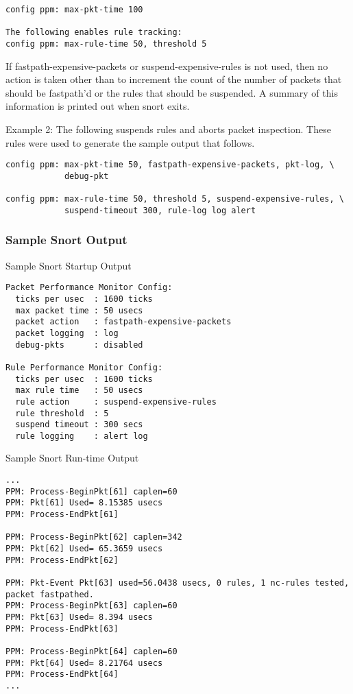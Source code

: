 \documentclass[english]{report}
\begin{document}
\begin{verbatim}
config ppm: max-pkt-time 100

The following enables rule tracking:
config ppm: max-rule-time 50, threshold 5
\end{verbatim}

If fastpath-expensive-packets or suspend-expensive-rules is not used, then
no action is taken other than to increment the count of the number of
packets that should be fastpath'd or the rules that should be suspended. A
summary of this information is printed out when snort exits.

Example 2:
The following suspends rules and aborts packet inspection.  These rules
were used to generate the sample output that follows.

\begin{verbatim}
config ppm: max-pkt-time 50, fastpath-expensive-packets, pkt-log, \
            debug-pkt

config ppm: max-rule-time 50, threshold 5, suspend-expensive-rules, \
            suspend-timeout 300, rule-log log alert
\end{verbatim}


\subsubsection{Sample Snort Output}

Sample Snort Startup Output
\begin{verbatim}
Packet Performance Monitor Config:
  ticks per usec  : 1600 ticks
  max packet time : 50 usecs
  packet action   : fastpath-expensive-packets
  packet logging  : log
  debug-pkts      : disabled

Rule Performance Monitor Config:
  ticks per usec  : 1600 ticks
  max rule time   : 50 usecs
  rule action     : suspend-expensive-rules
  rule threshold  : 5 
  suspend timeout : 300 secs
  rule logging    : alert log 
\end{verbatim}

Sample Snort Run-time Output
\begin{verbatim}
...
PPM: Process-BeginPkt[61] caplen=60
PPM: Pkt[61] Used= 8.15385 usecs
PPM: Process-EndPkt[61]

PPM: Process-BeginPkt[62] caplen=342
PPM: Pkt[62] Used= 65.3659 usecs
PPM: Process-EndPkt[62]

PPM: Pkt-Event Pkt[63] used=56.0438 usecs, 0 rules, 1 nc-rules tested, packet fastpathed.
PPM: Process-BeginPkt[63] caplen=60
PPM: Pkt[63] Used= 8.394 usecs
PPM: Process-EndPkt[63]

PPM: Process-BeginPkt[64] caplen=60
PPM: Pkt[64] Used= 8.21764 usecs
PPM: Process-EndPkt[64]
...
\end{verbatim}
\end{document}
